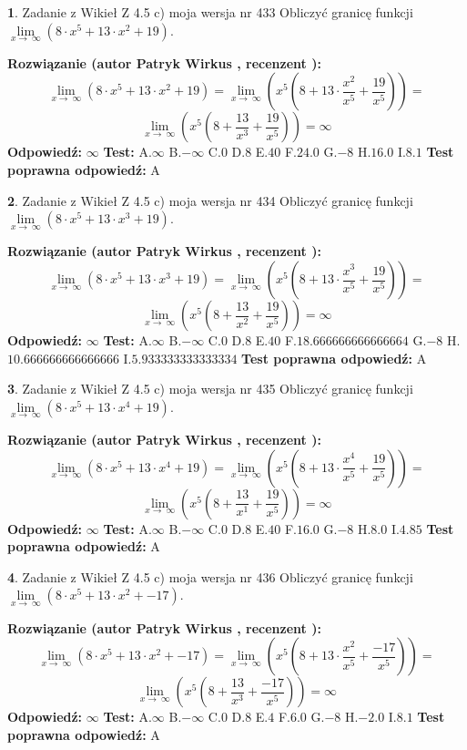 \documentclass[12pt, a4paper]{article}
\theoremstyle{definition} %
\newtheorem{zad}{}
\newcommand{\zadStart}[1]{\begin{zad}#1\newline}
\newcommand{\zadStop}{\end{zad}}
\newcommand{\rozwStart}[2]{\noindent \textbf{Rozwiązanie (autor #1 , recenzent #2): }\newline}
\newcommand{\rozwStop}{\newline}
\newcommand{\odpStart}{\noindent \textbf{Odpowiedź:}\newline}
\newcommand{\odpStop}{\newline}
\newcommand{\testStart}{\noindent \textbf{Test:}\newline}
\newcommand{\testStop}{\newline}
\newcommand{\kluczStart}{\noindent \textbf{Test poprawna odpowiedź:}\newline}
\newcommand{\kluczStop}{\newline}
\begin{document}
\zadStart{Zadanie z Wikieł Z 4.5 c) moja wersja nr 433}
Obliczyć granicę funkcji  $\lim\limits_{x\to\ \infty}(8 \cdot x^{5}+13 \cdot x^{2}+19)$.
\zadStop
\rozwStart{Patryk Wirkus}{}
$$\lim\limits_{x\to\ \infty}(8 \cdot x^{5}+13 \cdot x^{2}+19) = \lim\limits_{x\to\ \infty}(x^{5}(8 +13 \cdot \frac{x^{2}}{x^{5}}+\frac{19}{x^{5}})) =$$ $$\lim\limits_{x\to\ \infty}(x^{5}(8 +\frac{13}{x^{3}}+\frac{19}{x^{5}})) =\infty$$
\rozwStop
\odpStart
$\infty$
\odpStop
\testStart
A.$\infty$ B.$-\infty$ C.$0$ D.$8$ E.$40$
F.$24.0$ G.$-8$
H.$16.0$
I.$8.1$
\testStop
\kluczStart
A
\kluczStop



\zadStart{Zadanie z Wikieł Z 4.5 c) moja wersja nr 434}
Obliczyć granicę funkcji  $\lim\limits_{x\to\ \infty}(8 \cdot x^{5}+13 \cdot x^{3}+19)$.
\zadStop
\rozwStart{Patryk Wirkus}{}
$$\lim\limits_{x\to\ \infty}(8 \cdot x^{5}+13 \cdot x^{3}+19) = \lim\limits_{x\to\ \infty}(x^{5}(8 +13 \cdot \frac{x^{3}}{x^{5}}+\frac{19}{x^{5}})) =$$ $$\lim\limits_{x\to\ \infty}(x^{5}(8 +\frac{13}{x^{2}}+\frac{19}{x^{5}})) =\infty$$
\rozwStop
\odpStart
$\infty$
\odpStop
\testStart
A.$\infty$ B.$-\infty$ C.$0$ D.$8$ E.$40$
F.$18.666666666666664$ G.$-8$
H.$10.666666666666666$
I.$5.933333333333334$
\testStop
\kluczStart
A
\kluczStop



\zadStart{Zadanie z Wikieł Z 4.5 c) moja wersja nr 435}
Obliczyć granicę funkcji  $\lim\limits_{x\to\ \infty}(8 \cdot x^{5}+13 \cdot x^{4}+19)$.
\zadStop
\rozwStart{Patryk Wirkus}{}
$$\lim\limits_{x\to\ \infty}(8 \cdot x^{5}+13 \cdot x^{4}+19) = \lim\limits_{x\to\ \infty}(x^{5}(8 +13 \cdot \frac{x^{4}}{x^{5}}+\frac{19}{x^{5}})) =$$ $$\lim\limits_{x\to\ \infty}(x^{5}(8 +\frac{13}{x^{1}}+\frac{19}{x^{5}})) =\infty$$
\rozwStop
\odpStart
$\infty$
\odpStop
\testStart
A.$\infty$ B.$-\infty$ C.$0$ D.$8$ E.$40$
F.$16.0$ G.$-8$
H.$8.0$
I.$4.85$
\testStop
\kluczStart
A
\kluczStop



\zadStart{Zadanie z Wikieł Z 4.5 c) moja wersja nr 436}
Obliczyć granicę funkcji  $\lim\limits_{x\to\ \infty}(8 \cdot x^{5}+13 \cdot x^{2}+-17)$.
\zadStop
\rozwStart{Patryk Wirkus}{}
$$\lim\limits_{x\to\ \infty}(8 \cdot x^{5}+13 \cdot x^{2}+-17) = \lim\limits_{x\to\ \infty}(x^{5}(8 +13 \cdot \frac{x^{2}}{x^{5}}+\frac{-17}{x^{5}})) =$$ $$\lim\limits_{x\to\ \infty}(x^{5}(8 +\frac{13}{x^{3}}+\frac{-17}{x^{5}})) =\infty$$
\rozwStop
\odpStart
$\infty$
\odpStop
\testStart
A.$\infty$ B.$-\infty$ C.$0$ D.$8$ E.$4$
F.$6.0$ G.$-8$
H.$-2.0$
I.$8.1$
\testStop
\kluczStart
A
\kluczStop
\end{document}
